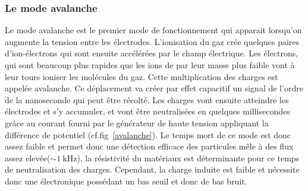 \subsubsection{Le mode avalanche}
Le mode avalanche est le premier mode de fonctionnement qui apparait lorsqu'on augmente la tension entre les électrodes. L'ionisation du gaz crée quelques paires d'ion-électrons qui sont ensuite accélérées par le champ électrique. Les électrons, qui sont beaucoup plus rapides que les ions de par leur masse plus faible vont à leur tours ioniser les molécules du gaz. Cette multiplication des charges est appelée avalanche. Ce déplacement va créer par effet capacitif un signal de l'ordre de la nanoseconde qui peut être récolté. Les charges vont ensuite atteindre les électrodes et s'y accumuler, et vont être neutralisées en quelques millisecondes grâce au courant fourni par le générateur de haute tension appliquant la différence de potentiel (cf.fig~\ref{avalanche}). Le temps mort de ce mode est donc assez faible et permet donc une détection efficace des particules mêle à des flux assez elevée($\sim\SI{1}{\kilo\hertz}$), la résistivité du matériaux est déterminante pour ce temps de neutralisation des charges. Cependant, la charge induite est faible et nécessite donc une électronique possédant un bas seuil et donc de bas bruit.


